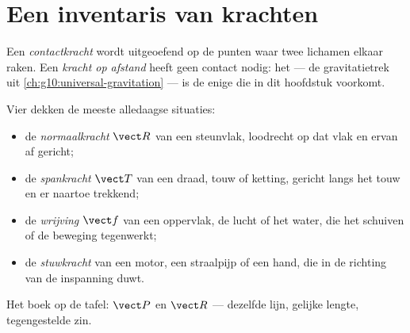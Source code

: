 \section{Een inventaris van krachten}

\begin{definition}\label{def:g10:inertia:contact}
Een \emph{contactkracht} wordt uitgeoefend op de
punten waar twee lichamen elkaar raken. Een \emph{kracht op
afstand} heeft geen contact nodig: het 
--- de gravitatietrek uit \cref{ch:g10:universal-gravitation} --- is de
enige die in dit hoofdstuk voorkomt.
\end{definition}

\begin{definition}\label{def:g10:inertia:inventory}
Vier  dekken de meeste alledaagse situaties:
\begin{itemize}
  \item de \emph{normaalkracht} $\vect R$ van een
        steunvlak, loodrecht op dat vlak en ervan af gericht;
  \item de \emph{spankracht} $\vect T$ van een draad,
        touw of ketting, gericht langs het touw en er naartoe trekkend;
  \item de \emph{wrijving} $\vect f$ van een oppervlak,
        de lucht of het water, die het schuiven of de beweging
        tegenwerkt;
  \item de \emph{stuwkracht} van een motor, een
        straalpijp of een hand, die in de richting van de inspanning
        duwt.
\end{itemize}
\end{definition}

\begin{omfigure}

{\small Het boek op de tafel:  $\vect P$ en 
$\vect R$ --- dezelfde lijn, gelijke lengte, tegengestelde zin.}
\end{omfigure}

